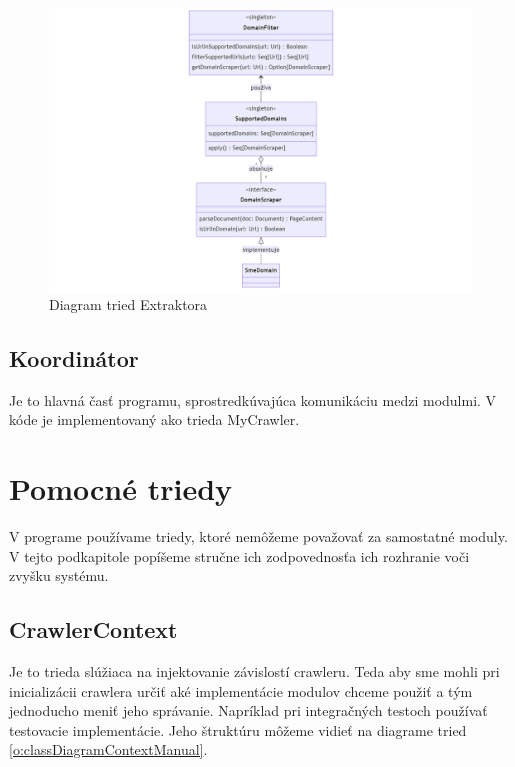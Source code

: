 \begin{figure}[!ht]
    \centering
    \includegraphics[width=1\textwidth]{figures/domainScraperChart.png}
    \caption{Diagram tried Extraktora\label{o:domScraperChart}}
\end{figure}

\subsection{Koordinátor}
Je to hlavná časť programu, sprostredkúvajúca komunikáciu medzi modulmi. V kóde je implementovaný ako trieda MyCrawler. 




\section{Pomocné triedy}
V programe používame triedy, ktoré nemôžeme považovať za samostatné moduly. V tejto podkapitole popíšeme stručne ich zodpovednosťa ich rozhranie voči zvyšku systému. 

\subsection{CrawlerContext}
Je to trieda slúžiaca na injektovanie závislostí crawleru. Teda aby sme mohli pri inicializácii crawlera určiť aké implementácie modulov chceme použiť a tým jednoducho meniť jeho správanie. Napríklad pri integračných testoch používať testovacie implementácie. Jeho štruktúru môžeme vidieť na diagrame tried \ref{o:classDiagramContextManual}.


